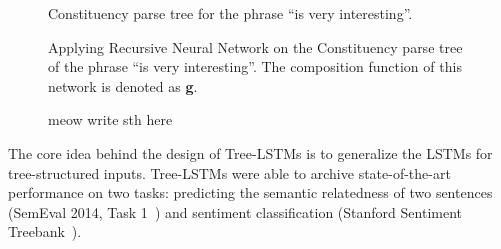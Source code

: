 \begin{figure}%
	\centering
	\caption[Constituency parse tree for the phrase ``is very interesting'']{Constituency parse tree for the phrase ``is very interesting''.}
	\label{fig:example-parse}
\end{figure}

\begin{figure} %
	\centering
	
	\caption[Applying Recursive Neural Network on the phrase ``is very interesting'']{Applying Recursive Neural Network on the Constituency parse tree of the phrase ``is very interesting''.
		The composition function of this network is denoted as \textbf{g}.}
	\label{fig:example-compose}
\end{figure}

\begin{figure} %
	\centering
	
	\caption[mewo write sth here]{meow write sth here}
	\label{fig:cnntreelstm}
\end{figure}

The core idea behind the design of Tree-LSTMs is to generalize the LSTMs for tree-structured inputs.
Tree-LSTMs were able to archive state-of-the-art performance on two tasks: predicting the semantic relatedness of two sentences (SemEval 2014, Task 1~\cite{SemeEvalTask1}) and sentiment classification (Stanford Sentiment Treebank~\cite{socher2013recursive}).

